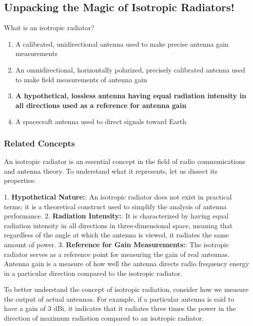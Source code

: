 \subsection{Unpacking the Magic of Isotropic Radiators!}

\begin{tcolorbox}[colback=gray!10, colframe=black, title=E9A01] What is an isotropic radiator? 
\begin{enumerate}[label=\Alph*.]
    \item A calibrated, unidirectional antenna used to make precise antenna gain measurements
    \item An omnidirectional, horizontally polarized, precisely calibrated antenna used to make field measurements of antenna gain
    \item \textbf{A hypothetical, lossless antenna having equal radiation intensity in all directions used as a reference for antenna gain}
    \item A spacecraft antenna used to direct signals toward Earth
\end{enumerate} \end{tcolorbox}

\subsubsection{Related Concepts}

An isotropic radiator is an essential concept in the field of radio communications and antenna theory. To understand what it represents, let us dissect its properties:

1. \textbf{Hypothetical Nature:}: An isotropic radiator does not exist in practical terms; it is a theoretical construct used to simplify the analysis of antenna performance.
2. \textbf{Radiation Intensity:}: It is characterized by having equal radiation intensity in all directions in three-dimensional space, meaning that regardless of the angle at which the antenna is viewed, it radiates the same amount of power.
3. \textbf{Reference for Gain Measurements:}: The isotropic radiator serves as a reference point for measuring the gain of real antennas. Antenna gain is a measure of how well the antenna directs radio frequency energy in a particular direction compared to the isotropic radiator.

To better understand the concept of isotropic radiation, consider how we measure the output of actual antennas. For example, if a particular antenna is said to have a gain of 3 dBi, it indicates that it radiates three times the power in the direction of maximum radiation compared to an isotropic radiator.

